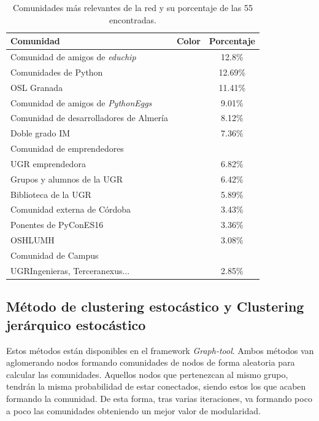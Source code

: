 \documentclass[paper=a4, fontsize=11pt]{article} %
\numberwithin{equation}{section} %
\numberwithin{figure}{section} %
\numberwithin{table}{section} %
\begin{document}
\begin{table}
  \begin{tabular}{l|c|c}
    Comunidad & Color & Porcentaje \\
    \hline
    Comunidad de amigos de \textit{educhip} & \cellcolor[RGB]{255, 186, 116} & 12.8\%\\
    Comunidades de Python & \cellcolor[RGB]{116,209,255} & 12.69\%\\
    OSL Granada & \cellcolor[RGB]{255, 153, 254} & 11.41\%\\
    Comunidad de amigos de \textit{PythonEggs} & \cellcolor[RGB]{200, 217, 117} & 9.01\%\\
    Comunidad de desarrolladores de Almería & \cellcolor[RGB]{255,207,173} & 8.12\%\\
    Doble grado IM & \cellcolor[RGB]{243,225,255} & 7.36\% \\
    Comunidad de emprendedores & \cellcolor[RGB]{138, 213, 168} & \\
    UGR emprendedora & \cellcolor[RGB]{138, 213, 168} & 6.82\%\\
    Grupos y alumnos de la UGR & \cellcolor[RGB]{213, 184, 138} & 6.42\%\\
    Biblioteca de la UGR & \cellcolor[RGB]{244,167,123} & 5.89\%\\
    Comunidad externa de Córdoba & \cellcolor[RGB]{133, 203, 195} & 3.43\%\\
    Ponentes de PyConES16 & \cellcolor[RGB]{255, 163, 163} &  3.36\%\\
    OSHLUMH & \cellcolor[RGB]{246, 197, 124} &  3.08\%\\
    Comunidad de Campus &\cellcolor[RGB]{153,255,128} & \\
    UGRIngenieras, Terceranexus... & \cellcolor[RGB]{153,255,128} & 2.85\%\\
  \end{tabular}
  \label{com_lov}
  \caption{Comunidades más relevantes de la red y su porcentaje de las 55 encontradas.}
\end{table}

\subsection{Método de clustering estocástico y Clustering jerárquico estocástico}

Estos métodos están disponibles en el framework \textit{Graph-tool}\cite{peixoto_graph-tool_2014}. Ambos métodos van aglomerando nodos formando comunidades de nodos de forma aleatoria para calcular las comunidades. Aquellos nodos que pertenezcan al mismo grupo, tendrán la misma probabilidad de estar conectados, siendo estos los que acaben formando la comunidad. De esta forma, tras varias iteraciones, va formando poco a poco las comunidades obteniendo un mejor valor de modularidad.
\end{document}
